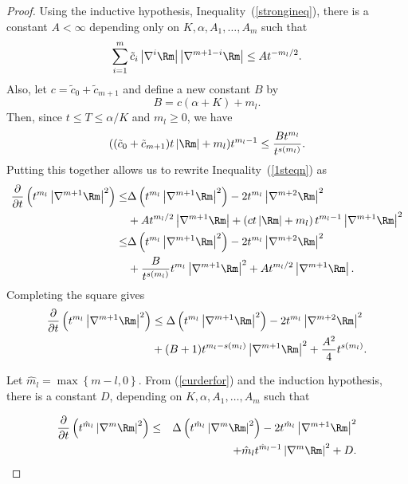 \begin{proof}
Using the inductive hypothesis, Inequality~(\ref{strongineq}), there is a constant
$A<\infty$ depending only on $K,\alpha,A_1,\ldots,A_m$ such that
$$
\sum_{i=1}^{m}\tilde c_{i}\left\vert \nabla
^{i}\Rm\right\vert \left\vert
\nabla^{m+1-i}\Rm \right\vert \leq At^{-m_l/2}.
$$
Also, let $c=\tilde c_{0}+\tilde c_{m+1}$ and define a new  constant
$B$
by%
$$B=c(\alpha+K)+m_l.$$ Then, since $t\le T\le \alpha/K$ and $m_l\ge 0$, we have
$$((\tilde c_{0}+\tilde c_{m+1})t\left\vert\Rm\right\vert +m_l)t^{m_l-1}\le
\frac{Bt^{m_l}}{t^{s(m_l)}}.$$ Putting this together allows us to
rewrite Inequality~(\ref{1steqn}) as
\begin{align*}
\frac{\partial}{\partial t}\left(  t^{m_l}\left\vert
\nabla^{m+1}\Rm\right\vert ^{2}\right)
 \leq &\Delta\left(  t^{m_l }\left\vert \nabla
^{m+1}\Rm\right\vert ^{2}\right)  -2t^{m_l }
\left\vert \nabla^{m+2}\Rm\right\vert ^{2}\\
 &
+At^{m_l /2}\left\vert \nabla^{m+1} \Rm\right\vert
+\left(ct\left\vert \Rm\right\vert +m_l \right)
t^{m_l -1}\left\vert \nabla^{m+1}\Rm\right\vert
^{2}\\
 \leq &\Delta\left(  t^{m_l }\left\vert \nabla
^{m+1}\Rm\right\vert ^{2}\right)  -2t^{m_l }
\left\vert \nabla^{m+2}\Rm\right\vert ^{2}\\
& +
\frac{B}{t^{s(m_l)}}t^{m_l}\left\vert\nabla^{m+1}\Rm\right\vert^2
+ At^{m_l/2}\left\vert\nabla^{m+1}\Rm\right\vert.
\end{align*}
Completing the square gives
\begin{align*}
\frac{\partial}{\partial t}\left(  t^{m_l}\left\vert
\nabla^{m+1}\Rm\right\vert ^{2}\right)
 &
\leq\Delta\left( t^{m_l }\left\vert \nabla
^{m+1}\Rm\right\vert ^{2}\right) -2t^{m_l  }
\left\vert \nabla^{m+2}\Rm\right\vert ^{2}\\
&  +(B+1)t^{m_l  -s(m_l)}\left\vert \nabla^{m+1}
\Rm\right\vert ^{2}+\frac{A^2}{4}t^{s(m_l)}.
\end{align*}

Let $\hat{m}_l = \max\left\{  m-l,0\right\} $. From
(\ref{curderfor}) and the induction hypothesis, there is a constant
$D$, depending on $K,\alpha,A_1,\ldots,A_m$ such that

\begin{eqnarray*}
\frac{\partial}{\partial t}\left(  t^{\hat{m}_l }\left\vert
\nabla^{m}\Rm\right\vert ^{2}\right) & \leq &
\Delta\left( t^{\hat{m}_l} \left\vert
\nabla^{m}\Rm\right\vert ^{2}\right) -2t^{\hat{m}_l
}\left\vert
\nabla^{m+1}\Rm\right\vert ^{2}\\
& & +\hat{m}_l  t^{\hat{m}_l  -1}\left\vert
\nabla^{m}\Rm\right\vert ^{2}+D.
\end{eqnarray*}


\end{proof}
